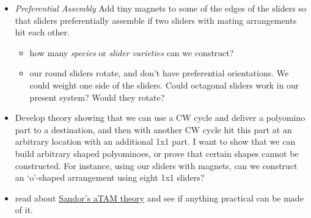 \documentclass[letterpaper, 10 pt, conference]{ieeeconf}
\begin{document}
\begin{itemize}
\item \emph{Preferential Assembly}
  Add tiny magnets to some of the edges of the sliders so that sliders preferentially assemble if two sliders with mating arrangements hit each other. 
  \begin{itemize}
  	\item how many \emph{species} or \emph{slider varieties} can we construct?
	\item our round sliders rotate, and don't have preferential orientations.  We could weight one side of the sliders.   Could octagonal sliders work in our present system?  Would they rotate?
	\end{itemize} 
\item Develop theory showing that we can use a CW cycle and deliver a polyomino part to a destination, and then with another CW cycle hit this part at an arbitrary location with an additional 1x1 part.  I want to show that we can build arbitrary shaped polyominoes, or prove that certain shapes cannot be constructed. For instance, using our sliders with magnets, can we construct an `o'-shaped arrangement using eight 1x1 sliders?
\item read about \href{http://arxiv.org/abs/1408.3351}{Sandor's aTAM theory} and see if anything practical can be made of it.
 \end{itemize} 
 
 
 
\end{document}

